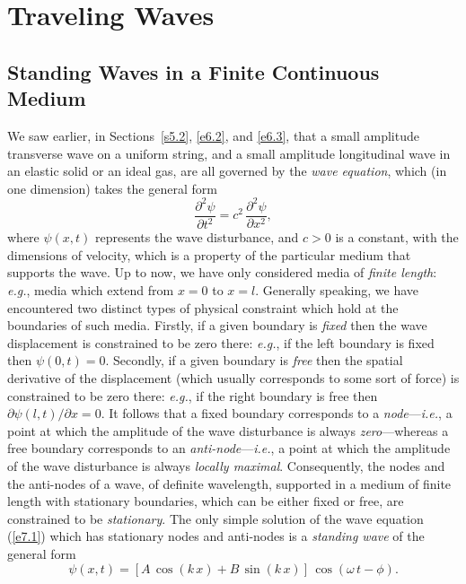 \chapter{Traveling Waves}\label{c7}
\section{Standing Waves in a Finite Continuous Medium}\label{s7.1}
We saw earlier, in Sections~\ref{s5.2}, \ref{e6.2}, and \ref{e6.3},
that a small amplitude transverse wave on a uniform string, and a small amplitude longitudinal
wave in an elastic solid or an ideal gas, are all governed by the
{\em wave equation}, which (in one dimension) takes the general form
\begin{equation}\label{e7.1}
\frac{\partial^2\psi}{\partial t^2} = c^2\,\frac{\partial^2 \psi}{\partial x^2},
\end{equation}
where $\psi(x,t)$ represents the wave disturbance, and $c>0$  is a constant, with the dimensions
of velocity, which is a property of the particular medium that supports the wave. Up to now, we have only considered  media of {\em finite length}: {\em e.g.}, media which extend from
$x=0$ to $x=l$. Generally speaking, we have encountered two distinct types of physical
constraint which hold at the boundaries of such media. Firstly, if a given boundary  is
{\em fixed}\/ then the wave displacement is constrained to be zero there: {\em e.g.}, if the left boundary is fixed then $\psi(0,t)=0$. Secondly, if a given boundary is {\em free}\/ then the spatial derivative
of the displacement (which usually corresponds to some sort of force) is constrained to be
zero there: {\em e.g.}, if the right boundary is free then $\partial\psi(l,t)/\partial x=0$. It follows that a fixed boundary corresponds to a {\em node}---{\em i.e.},
a point at which the amplitude of the wave disturbance is always {\em zero}---whereas a
free boundary corresponds to an {\em anti-node}---{\em i.e.}, a point at which the
amplitude of the wave disturbance is always {\em locally maximal}. Consequently, the 
nodes and the anti-nodes of a wave, of definite wavelength, supported in a medium of finite length with stationary boundaries, which can be  either fixed or free, are constrained to be {\em stationary}. The only simple solution of the wave equation
(\ref{e7.1}) which has stationary nodes and anti-nodes is a {\em standing wave}\/ of the general form
\begin{equation}\label{e7.2}
\psi(x,t) =[A\,\cos(k\,x)+B\,\sin(k\,x)]\,\cos(\omega\,t-\phi).
\end{equation}
